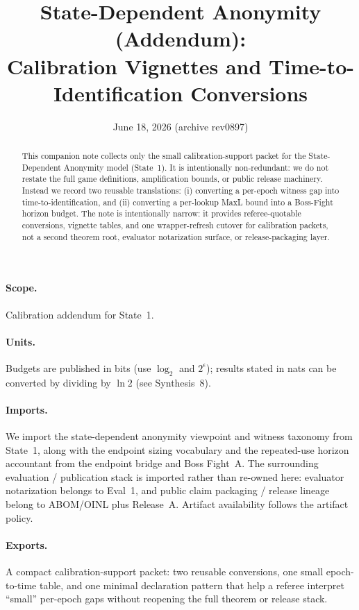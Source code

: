 \documentclass[11pt]{article}
\title{State-Dependent Anonymity (Addendum):\\Calibration Vignettes and Time-to-Identification Conversions}
\author{}
\date{June 18, 2026 (archive rev0897)}
\theoremstyle{definition}
\theoremstyle{remark}
\begin{document}
\maketitle

\begin{abstract}
This companion note collects only the small calibration-support packet for the State-Dependent Anonymity model (State~1).
It is intentionally non-redundant: we do not restate the full game definitions, amplification bounds, or public release machinery.
Instead we record two reusable translations:
(i) converting a per-epoch witness gap into time-to-identification, and
(ii) converting a per-lookup MaxL bound into a Boss-Fight horizon budget.
The note is intentionally narrow: it provides referee-quotable conversions, vignette tables, and one wrapper-refresh cutover for calibration packets, not a second theorem root, evaluator notarization surface, or release-packaging layer.
\end{abstract}

\paragraph{Scope.}
Calibration addendum for State~1.\cite{series:state1}

\paragraph{Units.} Budgets are published in bits (use $\log_2$ and $2^{\epsilon}$); results stated in nats can be converted by dividing by $\ln 2$ (see Synthesis~8).\cite{series:notation}

\paragraph{Imports.}
We import the state-dependent anonymity viewpoint and witness taxonomy from State~1, along with the endpoint sizing vocabulary and the repeated-use horizon accountant from the endpoint bridge and Boss Fight~A.\cite{series:state1,series:endpointbridge,series:bossfightA}
The surrounding evaluation / publication stack is imported rather than re-owned here: evaluator notarization belongs to Eval~1, and public claim packaging / release lineage belong to ABOM/OINL plus Release~A.\cite{series:evalnotary,series:abomoinl,series:releaseproperty}
Artifact availability follows the artifact policy.\cite{series:artifactpolicy}

\paragraph{Exports.}
A compact calibration-support packet: two reusable conversions, one small epoch-to-time table, and one minimal declaration pattern that help a referee interpret ``small'' per-epoch gaps without reopening the full theorem or release stack.
\end{document}
